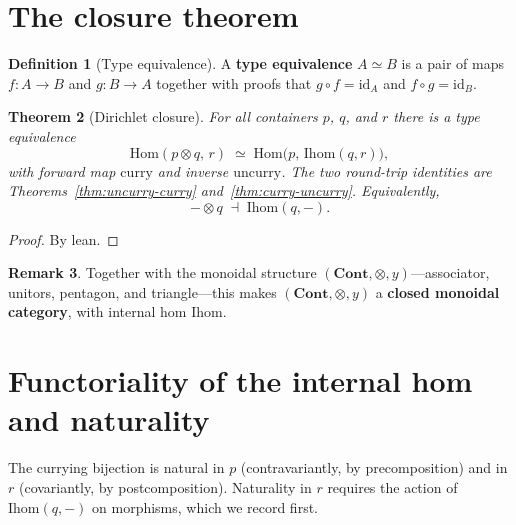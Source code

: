 \documentclass[11pt,a4paper]{article}
\theoremstyle{plain}
\newtheorem{theorem}{Theorem}[section]
\theoremstyle{definition}
\newtheorem{definition}[theorem]{Definition}
\newtheorem{remark}[theorem]{Remark}
\newcommand{\id}{\mathrm{id}}
\newcommand{\Ihom}{\mathrm{Ihom}}
\newcommand{\Cont}{\mathbf{Cont}}
\newcommand{\Hom}{\mathrm{Hom}}
\begin{document}
\section{The closure theorem}

\begin{definition}[Type equivalence]
A \textbf{type equivalence} $A \simeq B$ is a pair of maps
$f : A \to B$ and $g : B \to A$ together with proofs that $g \circ f = \id_A$
and $f \circ g = \id_B$.
\end{definition}

\begin{theorem}[Dirichlet closure]\label{thm:closure}
For all containers $p$, $q$, and $r$ there is a type equivalence
\begin{equation}
  \Hom(p \otimes q,\, r)
  \;\simeq\;
  \Hom\bigl(p,\, \Ihom(q,r)\bigr),
\end{equation}
with forward map $\mathrm{curry}$ and inverse $\mathrm{uncurry}$. The two
round-trip identities are Theorems~\ref{thm:uncurry-curry}
and~\ref{thm:curry-uncurry}. Equivalently,
\begin{equation}
  - \otimes q \;\dashv\; \Ihom(q,-).
\end{equation}
\end{theorem}

\begin{proof}
By lean.
\end{proof}

\begin{remark}
Together with the monoidal structure $(\Cont, \otimes, y)$---associator,
unitors, pentagon, and triangle---this makes $(\Cont, \otimes, y)$ a
\textbf{closed monoidal category}, with internal hom $\Ihom$.
\end{remark}

\section{Functoriality of the internal hom and naturality}

The currying bijection is natural in $p$ (contravariantly, by
precomposition) and in $r$ (covariantly, by postcomposition). Naturality in
$r$ requires the action of $\Ihom(q,-)$ on morphisms, which we record first.
\end{document}
